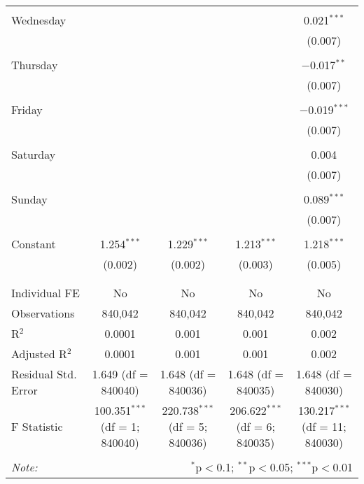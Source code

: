 \documentclass[
]{article}
\begin{document}
\begin{table}[!htbp]
{\begin{tabular}{@{\extracolsep{5pt}}lcccc}
  & & & & \\ 
 Wednesday &  &  &  & 0.021$^{***}$ \\ 
  &  &  &  & (0.007) \\ 
  & & & & \\ 
 Thursday &  &  &  & $-$0.017$^{**}$ \\ 
  &  &  &  & (0.007) \\ 
  & & & & \\ 
 Friday &  &  &  & $-$0.019$^{***}$ \\ 
  &  &  &  & (0.007) \\ 
  & & & & \\ 
 Saturday &  &  &  & 0.004 \\ 
  &  &  &  & (0.007) \\ 
  & & & & \\ 
 Sunday &  &  &  & 0.089$^{***}$ \\ 
  &  &  &  & (0.007) \\ 
  & & & & \\ 
 Constant & 1.254$^{***}$ & 1.229$^{***}$ & 1.213$^{***}$ & 1.218$^{***}$ \\ 
  & (0.002) & (0.002) & (0.003) & (0.005) \\ 
  & & & & \\ 
\hline \\[-1.8ex] 
Individual FE & No & No & No & No \\ 
Observations & 840,042 & 840,042 & 840,042 & 840,042 \\ 
R$^{2}$ & 0.0001 & 0.001 & 0.001 & 0.002 \\ 
Adjusted R$^{2}$ & 0.0001 & 0.001 & 0.001 & 0.002 \\ 
Residual Std. Error & 1.649 (df = 840040) & 1.648 (df = 840036) & 1.648 (df = 840035) & 1.648 (df = 840030) \\ 
F Statistic & 100.351$^{***}$ (df = 1; 840040) & 220.738$^{***}$ (df = 5; 840036) & 206.622$^{***}$ (df = 6; 840035) & 130.217$^{***}$ (df = 11; 840030) \\ 
\hline 
\hline \\[-1.8ex] 
\textit{Note:}  & \multicolumn{4}{r}{$^{*}$p$<$0.1; $^{**}$p$<$0.05; $^{***}$p$<$0.01} \\ 
\end{tabular}
} 
\end{table} 
\newpage
\end{document}
